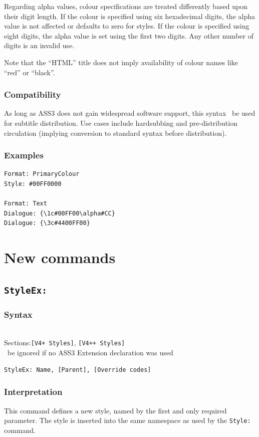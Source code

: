 \documentclass{spec}
\newcommand{\syntax}[1]{
	\subsubsection*{Syntax}
	\begin{tabbing}
	\hspace{2cm}\=\\[-16pt]
	#1
	\end{tabbing}
}
\gdef\compat{}
\newcommand{\mustuse}[1]{\must\ be ignored if no ASS3 Extension declaration was used%
\gappto{\compat}{\hspace{9pt} #1 & \textbf{required}\\[3pt]}}
\newcommand{\secspecs}[2]{Sections:\>\texttt{#1}, \texttt{#2}}
\begin{document}
Regarding alpha values, colour specifications are treated differently
based upon their digit length. If the colour is specified using six
hexadecimal digits, the alpha value is not affected or defaults to zero
for styles. If the colour is specified using eight digits, the alpha
value is set using the first two digits. Any other number of digits
is an invalid use.

Note that the ``HTML'' title does not imply availability of colour names
like ``red'' or ``black''.

\subsubsection*{Compatibility}
As long as ASS3 does not gain widespread software support, this syntax
\shouldnot\ be used for subtitle distribution. Use cases include
hardsubbing and pre-distribution circulation (implying conversion to
standard syntax before distribution).

\subsubsection*{Examples}
\begin{verbatim}
Format: PrimaryColour
Style: #00FF0000

Format: Text
Dialogue: {\1c#00FF00\alpha#CC}
Dialogue: {\3c#4400FF00}
\end{verbatim}

\section{New commands}
\subsection{\texttt{StyleEx:}}
\syntax{
	\secspecs{[V4+ Styles]}{[V4++ Styles]}\\
	\mustuse{StyleEx}
}

\begin{verbatim}
StyleEx: Name, [Parent], [Override codes]
\end{verbatim}

\subsubsection*{Interpretation}
This command defines a new style, named by the first and only required
parameter. The style is inserted into the same namespace as used by the
\verb!Style:! command.
\end{document}
